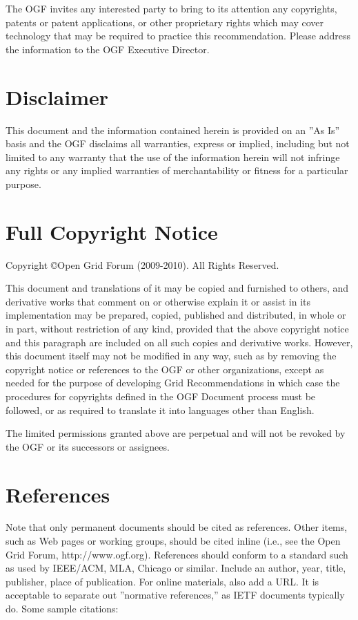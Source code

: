 \documentclass[10pt,a4paper]{article}
\begin{document}
The OGF invites any interested party to bring to its attention any copyrights, patents or patent applications, or other proprietary rights which may cover technology that may be required to practice this recommendation. Please address the information to the OGF Executive Director.

\section{Disclaimer}

This document and the information contained herein is provided on an ''As Is'' basis and the OGF disclaims all warranties, express or implied, including but not limited to any warranty that the use of the information herein will not infringe any rights or any implied warranties of merchantability or fitness for a particular purpose.

\section{Full Copyright Notice}

Copyright \copyright Open Grid Forum (2009-2010). All Rights Reserved.

This document and translations of it may be copied and furnished to others, and derivative works that comment on or otherwise explain it or assist in its implementation may be prepared, copied, published and distributed, in whole or in part, without restriction of any kind, provided that the above copyright notice and this paragraph are included on all such copies and derivative works. However, this document itself may not be modified in any way, such as by removing the copyright notice or references to the OGF or other organizations, except as needed for the purpose of developing Grid Recommendations in which case the procedures for copyrights defined in the OGF Document process must be followed, or as required to translate it into languages other than English.

The limited permissions granted above are perpetual and will not be revoked by the OGF or its successors or assignees.

\section{References}

Note that only permanent documents should be cited as references. Other items, such as Web pages or working groups, should be cited inline (i.e., see the Open Grid Forum, http://www.ogf.org). References should conform to a standard such as used by IEEE/ACM, MLA, Chicago or similar. Include an author, year, title, publisher, place of publication. For online materials, also add a URL. It is acceptable to separate out ''normative references,'' as IETF documents typically do. Some sample citations: 
\end{document}
